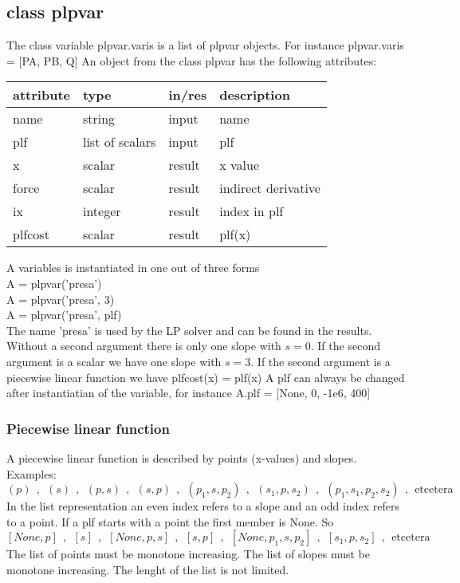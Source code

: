 \documentclass[]{article}
\begin{document}
\subsection{class plpvar}
The class variable plpvar.varis is a list of plpvar objects.
For instance plpvar.varis = [PA, PB, Q]
An object from the class plpvar has the following attributes:
\begin{center}
\begin{tabular}{|l|l|l|l|}\hline
  attribute & type     & in/res & description \\ \hline \hline
  name      & string   & input  & name \\ \hline
  plf       & list of scalars   & input  & plf  \\ \hline
  x         & scalar   & result & x value\\ \hline
  force     & scalar   & result & indirect derivative\\ \hline
  ix        & integer  & result & index in plf\\ \hline
  plfcost   & scalar   & result & plf(x)\\ \hline
\end{tabular}
\end{center}
A variables is instantiated in one out of three forms\\
A = plpvar('presa') \\
A = plpvar('presa', 3) \\
A = plpvar('presa', plf)\\
The name 'presa' is used by the LP solver and can be found in the results.
Without a second argument there is only one slope with $s = 0$.
If the second argument is a scalar we have one slope with $s = 3$.
If the second argument is a piecewise linear function we have plfcost(x) = plf(x)
A plf can always be changed after instantiatian of the variable, 
for instance A.plf = [None, 0, -1e6, 400]

\subsubsection{Piecewise linear function}
A piecewise linear function is described by points (x-values) and slopes. Examples:
\[ (p)~~,~~(s)~~,~~(p,s)~~,~~(s,p)~~,~~(p_1,s,p_2)~~,~~(s_1,p,s_2)
       ~~,~~(p_1,s_1,p_2,s_2)~~,~~\text{etcetera}\]
In the list representation an even index refers to a slope and an odd index refers to a point.
If a plf starts with a point the first member is None. So
\[ [None,p]~~,~~[s]~~,~~[None,p,s]~~,~~[s,p]
       ~~,~~[None,p_1,s,p_2]~~,~~[s_1,p,s_2]~~,~~\text{etcetera}\]
The list of points must be monotone increasing.
The list of slopes must be monotone increasing.
The lenght of the list is not limited.
\end{document}
